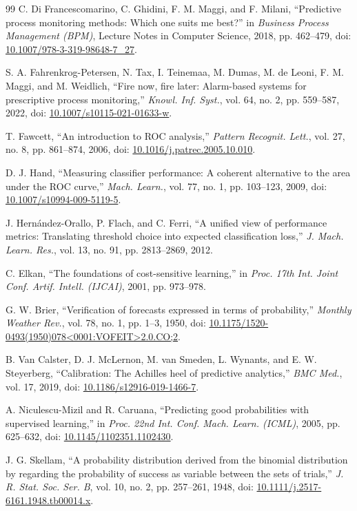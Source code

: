 \documentclass[journal]{IEEEtran}
\begin{document}
\begin{thebibliography}{99}
 C. Di Francescomarino, C. Ghidini, F. M. Maggi, and F. Milani, ``Predictive process monitoring methods: Which one suits me best?'' in \emph{Business Process Management (BPM)}, Lecture Notes in Computer Science, 2018, pp. 462--479, doi: \url{10.1007/978-3-319-98648-7_27}.

 S. A. Fahrenkrog-Petersen, N. Tax, I. Teinemaa, M. Dumas, M. de Leoni, F. M. Maggi, and M. Weidlich, ``Fire now, fire later: Alarm-based systems for prescriptive process monitoring,'' \emph{Knowl. Inf. Syst.}, vol. 64, no. 2, pp. 559--587, 2022, doi: \url{10.1007/s10115-021-01633-w}.

 T. Fawcett, ``An introduction to ROC analysis,'' \emph{Pattern Recognit. Lett.}, vol. 27, no. 8, pp. 861--874, 2006, doi: \url{10.1016/j.patrec.2005.10.010}.

 D. J. Hand, ``Measuring classifier performance: A coherent alternative to the area under the ROC curve,'' \emph{Mach. Learn.}, vol. 77, no. 1, pp. 103--123, 2009, doi: \url{10.1007/s10994-009-5119-5}.

 J. Hern\'andez-Orallo, P. Flach, and C. Ferri, ``A unified view of performance metrics: Translating threshold choice into expected classification loss,'' \emph{J. Mach. Learn. Res.}, vol. 13, no. 91, pp. 2813--2869, 2012.

 C. Elkan, ``The foundations of cost-sensitive learning,'' in \emph{Proc. 17th Int. Joint Conf. Artif. Intell. (IJCAI)}, 2001, pp. 973--978.

 G. W. Brier, ``Verification of forecasts expressed in terms of probability,'' \emph{Monthly Weather Rev.}, vol. 78, no. 1, pp. 1--3, 1950, doi: \url{10.1175/1520-0493(1950)078<0001:VOFEIT>2.0.CO;2}.

 B. Van Calster, D. J. McLernon, M. van Smeden, L. Wynants, and E. W. Steyerberg, ``Calibration: The Achilles heel of predictive analytics,'' \emph{BMC Med.}, vol. 17, 2019, doi: \url{10.1186/s12916-019-1466-7}.

 A. Niculescu-Mizil and R. Caruana, ``Predicting good probabilities with supervised learning,'' in \emph{Proc. 22nd Int. Conf. Mach. Learn. (ICML)}, 2005, pp. 625--632, doi: \url{10.1145/1102351.1102430}.

 J. G. Skellam, ``A probability distribution derived from the binomial distribution by regarding the probability of success as variable between the sets of trials,'' \emph{J. R. Stat. Soc. Ser. B}, vol. 10, no. 2, pp. 257--261, 1948, doi: \url{10.1111/j.2517-6161.1948.tb00014.x}.


\end{thebibliography}
\end{document}
